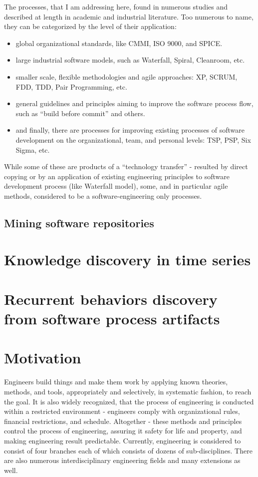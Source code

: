 The processes, that I am addressing here, found in numerous studies and described at length in 
academic and industrial literature. Too numerous to name, they can be categorized by the level 
of their application:
\begin{itemize}
 \item global organizational standards, like CMMI, ISO 9000, and SPICE. 
 \item large industrial software models, such as Waterfall, Spiral, Cleanroom, etc.
 \item smaller scale, flexible methodologies and agile approaches: XP, SCRUM, FDD, 
TDD, Pair Programming, etc.
 \item general guidelines and principles aiming to improve the software process flow, 
such as ``build before commit'' and others.
 \item and finally, there are processes for improving existing processes of software development 
on the organizational, team, and personal levels: TSP, PSP, Six Sigma, etc.
\end{itemize}
While some of these are products of a ``technology transfer'' - resulted by direct copying or by an 
application of existing engineering principles to software development process (like Waterfall model), 
some, and in particular agile methods, considered to be a software-engineering only processes. 

\subsection{Mining software repositories}

\section{Knowledge discovery in time series}

\section{Recurrent behaviors discovery from software process artifacts}

\section{Motivation}
Engineers build things and make them work by applying known theories, methods, 
and tools, appropriately and selectively, in systematic fashion, to reach the goal. 
It is also widely recognized, that the process of engineering is conducted 
within a restricted environment - engineers comply with organizational rules, 
financial restrictions, and schedule. Altogether - these methods and principles 
control the process of engineering, assuring it safety for life and property, 
and making engineering result predictable. Currently, engineering is considered to 
consist of four branches each of which consists of dozens of sub-disciplines. 
There are also numerous interdisciplinary 
engineering fields and many extensions as well. 

